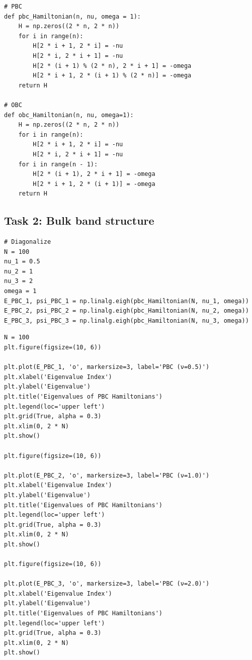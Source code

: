 \documentclass{report}
\begin{document}
\begin{lstlisting}
# PBC 
def pbc_Hamiltonian(n, nu, omega = 1):
    H = np.zeros((2 * n, 2 * n))
    for i in range(n):
        H[2 * i + 1, 2 * i] = -nu
        H[2 * i, 2 * i + 1] = -nu
        H[2 * (i + 1) % (2 * n), 2 * i + 1] = -omega
        H[2 * i + 1, 2 * (i + 1) % (2 * n)] = -omega
    return H

# OBC
def obc_Hamiltonian(n, nu, omega=1):
    H = np.zeros((2 * n, 2 * n))
    for i in range(n):
        H[2 * i + 1, 2 * i] = -nu
        H[2 * i, 2 * i + 1] = -nu
    for i in range(n - 1):
        H[2 * (i + 1), 2 * i + 1] = -omega
        H[2 * i + 1, 2 * (i + 1)] = -omega
    return H
\end{lstlisting}

\subsection*{Task 2: Bulk band structure}

\begin{lstlisting}
# Diagonalize
N = 100
nu_1 = 0.5
nu_2 = 1
nu_3 = 2
omega = 1
E_PBC_1, psi_PBC_1 = np.linalg.eigh(pbc_Hamiltonian(N, nu_1, omega))
E_PBC_2, psi_PBC_2 = np.linalg.eigh(pbc_Hamiltonian(N, nu_2, omega))
E_PBC_3, psi_PBC_3 = np.linalg.eigh(pbc_Hamiltonian(N, nu_3, omega))
\end{lstlisting}

\begin{lstlisting}
N = 100
plt.figure(figsize=(10, 6))

plt.plot(E_PBC_1, 'o', markersize=3, label='PBC (ν=0.5)')
plt.xlabel('Eigenvalue Index')
plt.ylabel('Eigenvalue')
plt.title('Eigenvalues of PBC Hamiltonians')
plt.legend(loc='upper left')
plt.grid(True, alpha = 0.3)
plt.xlim(0, 2 * N)
plt.show()

plt.figure(figsize=(10, 6))

plt.plot(E_PBC_2, 'o', markersize=3, label='PBC (ν=1.0)')
plt.xlabel('Eigenvalue Index')
plt.ylabel('Eigenvalue')
plt.title('Eigenvalues of PBC Hamiltonians')
plt.legend(loc='upper left')
plt.grid(True, alpha = 0.3)
plt.xlim(0, 2 * N)
plt.show()

plt.figure(figsize=(10, 6))

plt.plot(E_PBC_3, 'o', markersize=3, label='PBC (ν=2.0)')
plt.xlabel('Eigenvalue Index')
plt.ylabel('Eigenvalue')
plt.title('Eigenvalues of PBC Hamiltonians')
plt.legend(loc='upper left')
plt.grid(True, alpha = 0.3)
plt.xlim(0, 2 * N)
plt.show()
\end{lstlisting}
\end{document}
